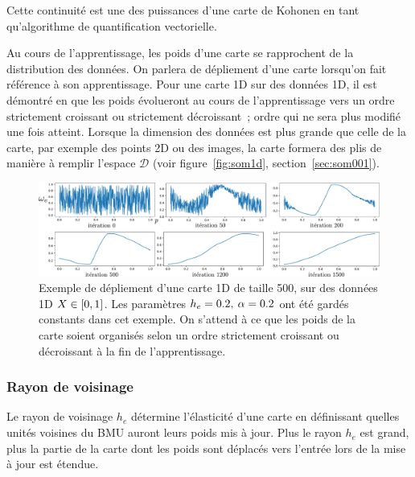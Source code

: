 \documentclass[../main]{subfiles}
\begin{document}
Cette continuité est une des puissances d'une carte de Kohonen en tant qu'algorithme de quantification vectorielle. 

Au cours de l'apprentissage, les poids d'une carte se rapprochent de la distribution des données. On parlera de dépliement d'une carte lorsqu'on fait référence à son apprentissage.
Pour une carte 1D sur des données 1D, il est démontré en \cite{Cottrell1998TheoreticalAO} que les poids évolueront au cours de l'apprentissage vers un ordre strictement croissant ou strictement décroissant~; ordre qui ne sera plus modifié une fois atteint. 
Lorsque la dimension des données est plus grande que celle de la carte, par exemple des points 2D ou des images, la carte formera des plis de manière à remplir l'espace $\mathcal{D}$ (voir figure~\ref{fig:som1d}, section~\ref{sec:som001}). 

\begin{figure}
\centering
\includegraphics[width=\textwidth]{depliement_1D.pdf}
\caption{Exemple de dépliement d'une carte 1D de taille 500, sur des données 1D $X \in [0,1]$. Les paramètres $h_{e} = 0.2, \: \alpha = 0.2$ ont été gardés constants dans cet exemple. On s'attend à ce que les poids de la carte soient organisés selon un ordre strictement croissant ou décroissant à la fin de l'apprentissage.}
\label{fig:depliement}
\end{figure}

\subsubsection{Rayon de voisinage}

Le rayon de voisinage $h_e$ détermine l'élasticité d'une carte en définissant quelles unités voisines du BMU auront leurs poids mis à jour.
Plus le rayon $h_e$ est grand, plus la partie de la carte dont les poids sont déplacés vers l'entrée lors de la mise à jour est étendue. 
\end{document}
